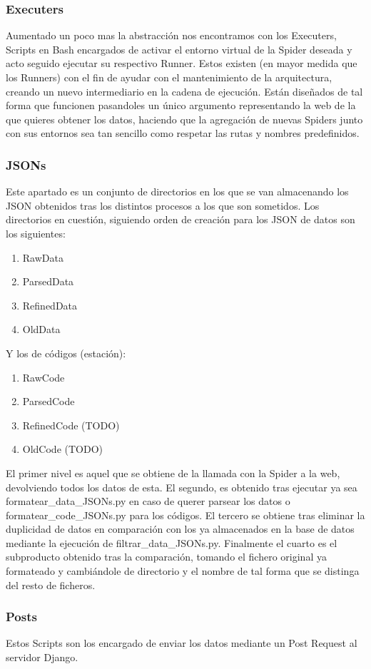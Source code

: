 \subsubsection{Executers}
Aumentado un poco mas la abstracción nos encontramos con los Executers, Scripts en Bash encargados de activar el entorno virtual de la Spider deseada y acto seguido ejecutar su respectivo Runner.
Estos existen (en mayor medida que los Runners) con el fin de ayudar con el mantenimiento de la arquitectura, creando un nuevo intermediario en la cadena de ejecución.
Están diseñados de tal forma que funcionen pasandoles un único argumento representando la web de la que quieres obtener los datos, haciendo que la agregación de nuevas Spiders junto con sus entornos sea tan sencillo como respetar las rutas y nombres predefinidos.

\subsubsection{JSONs}
Este apartado es un conjunto de directorios en los que se van almacenando los JSON obtenidos tras los distintos procesos a los que son sometidos.
Los directorios en cuestión, siguiendo orden de creación para los JSON de datos son los siguientes:
\begin{enumerate}
	\item RawData
	\item ParsedData
	\item RefinedData
	\item OldData
\end{enumerate}
Y los de códigos (estación):
\begin{enumerate}
	\item RawCode
	\item ParsedCode
	\item RefinedCode (TODO)
	\item OldCode (TODO)
\end{enumerate}
El primer nivel es aquel que se obtiene de la llamada con la Spider a la web, devolviendo todos los datos de esta.\newline
El segundo, es obtenido tras ejecutar ya sea formatear\_data\_JSONs.py en caso de querer parsear los datos o formatear\_code\_JSONs.py para los códigos.\newline
El tercero se obtiene tras eliminar la duplicidad de datos en comparación con los ya almacenados en la base de datos mediante la ejecución de filtrar\_data\_JSONs.py.\newline
Finalmente el cuarto es el subproducto obtenido tras la comparación, tomando el fichero original ya formateado y cambiándole de directorio y el nombre de tal forma que se distinga del resto de ficheros.\newline

\subsubsection{Posts}
Estos Scripts son los encargado de enviar los datos mediante un Post Request al servidor Django.






